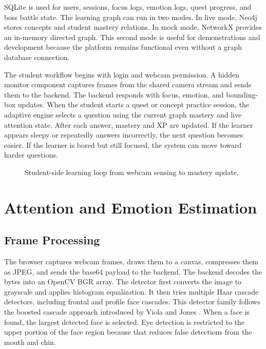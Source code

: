 \documentclass[conference]{IEEEtran}
\begin{document}
SQLite is used for users, sessions, focus logs, emotion logs, quest progress, and boss battle state. The learning graph can run in two modes. In live mode, Neo4j stores concepts and student mastery relations. In mock mode, NetworkX provides an in-memory directed graph. This second mode is useful for demonstrations and development because the platform remains functional even without a graph database connection.

The student workflow begins with login and webcam permission. A hidden monitor component captures frames from the shared camera stream and sends them to the backend. The backend responds with focus, emotion, and bounding-box updates. When the student starts a quest or concept practice session, the adaptive engine selects a question using the current graph mastery and live attention state. After each answer, mastery and XP are updated. If the learner appears sleepy or repeatedly answers incorrectly, the next question becomes easier. If the learner is bored but still focused, the system can move toward harder questions.

\begin{figure}[!htbp]
  \centering
  \resizebox{\columnwidth}{!}{}
  \caption{Student-side learning loop from webcam sensing to mastery update.}
  \label{fig:studentflow}
\end{figure}

\FloatBarrier

\section{Attention and Emotion Estimation}

\subsection{Frame Processing}

The browser captures webcam frames, draws them to a canvas, compresses them as JPEG, and sends the base64 payload to the backend. The backend decodes the bytes into an OpenCV BGR array. The detector first converts the image to grayscale and applies histogram equalization. It then tries multiple Haar cascade detectors, including frontal and profile face cascades. This detector family follows the boosted cascade approach introduced by Viola and Jones \cite{viola2001rapid}. When a face is found, the largest detected face is selected. Eye detection is restricted to the upper portion of the face region because that reduces false detections from the mouth and chin.
\end{document}
